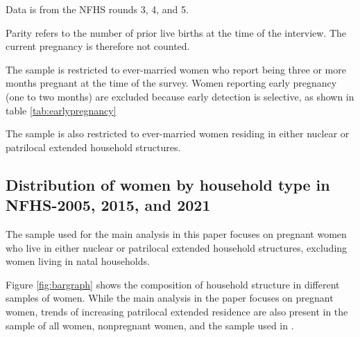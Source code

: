 \documentclass[12pt]{article}
\begin{document}
\begin{landscape}

\begin{table}[H]
    \centering
    \begin{threeparttable}[t]
        \caption{: More than half of the increase in patrilocal extended household residence among pregnant women between 2005-2006 and 2019-2021 can be explained by lower parities in 2019-2021}
        \label{tab:proppatrilocal}

        \scriptsize
        \setlength{\tabcolsep}{6pt}
        \renewcommand{\arraystretch}{1.3}

        

        \begin{tablenotes}
            \item Data is from the NFHS rounds 3, 4, and 5.
            \item Parity refers to the number of prior live births at the time of the interview.  The current pregnancy is therefore not counted.
            \item The sample is restricted to ever-married women who report being three or more months pregnant at the time of the survey. Women reporting early pregnancy (one to two months) are excluded because early detection is selective, as shown in table \ref{tab:earlypregnancy}
            \item The sample is also restricted to ever-married women residing in either nuclear or patrilocal extended household structures. 
        \end{tablenotes}
    \end{threeparttable}
\end{table}

\end{landscape}



    
\subsection{Distribution of women by household type in NFHS-2005, 2015, and 2021}

The sample used for the main analysis in this paper focuses on pregnant women who live in either nuclear or patrilocal extended household structures, excluding women living in natal households.

Figure \ref{fig:bargraph} shows the composition of household structure in different samples of women. While the main analysis in the paper focuses on pregnant women, trends of increasing patrilocal extended residence are also present in the sample of all women, nonpregnant women, and the sample used in \cite{allendorf2013going}. 
\end{document}
